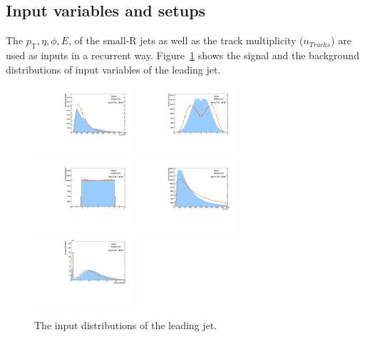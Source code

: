 \subsection{Input variables and setups}
The $p_\mathrm{T}, \eta, \phi, E$, of the small-R jets as well as the track multiplicity ($n_{Tracks}$) are used as inputs in a recurrent way. 
Figure~\ref{fig:RNNinput} shows the signal and the background distributions of input variables of the leading jet.
\begin{figure}[htbp]
    \centering
    \includegraphics[width=0.33\textwidth]{figures/RNN/inputs/j1pT.pdf}
    \includegraphics[width=0.33\textwidth]{figures/RNN/inputs/j1eta.pdf}
    \includegraphics[width=0.33\textwidth]{figures/RNN/inputs/j1phi.pdf}
    \includegraphics[width=0.33\textwidth]{figures/RNN/inputs/j1E.pdf}
    \includegraphics[width=0.33\textwidth]{figures/RNN/inputs/j1nTracks.pdf}
    \caption{ The input distributions of the leading jet. 
    }
    \label{fig:RNNinput}
\end{figure}


